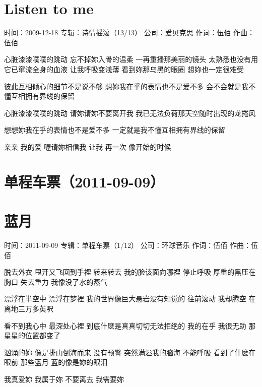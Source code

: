 \documentclass[UTF8,a4paper,oneside,twocolumn,12pt]{ctexbook}
\newcommand{\infopair}[2]{\textbullet #1：#2}
\newcommand{\zc}[1][伍佰]{\infopair{作词}{#1}}
\newcommand{\zq}[1][伍佰]{\infopair{作曲}{#1}}
\newcommand{\zj}[1]{\infopair{专辑}{#1}}
\newcommand{\sj}[1]{\infopair{时间}{#1}}
\newcommand{\gs}[1]{\infopair{公司}{#1}}
\newenvironment{info}{\begin{flushleft}\kaishu
	}
	{\end{flushleft}\normalsize\yahei\par}
\newenvironment{lyric}{
	}
{}
\begin{document}
\section{Listen to me}
\begin{info}
	\sj{2009-12-18}
	\zj{诗情摇滚（13/13）}
	\gs{爱贝克思}
	\zc
	\zq
\end{info}
\begin{lyric}
	心脏漆漆噗噗的跳动 忘不掉妳入骨的温柔
	一再重播那美丽的镜头 太熟悉也没有用
	它已窜流全身的血液 让我呼吸变浅薄
	看到妳那乌黑的眼圈 想妳也一定很难受

	彼此互相倾心的细节不是说不够
	想妳我在乎的表情也不是爱不多
	会不会就是我不懂互相拥有界线的保留

	心脏漆漆噗噗的跳动 请妳请妳不要离开我
	我已无法负荷那天空随时出现的龙捲风

	想想妳我在乎的表情也不是爱不多
	一定就是我不懂互相拥有界线的保留

	亲亲 我的爱 喔请妳相信我
	让我 再一次 像开始的时候
\end{lyric}

\section*{单程车票（2011-09-09）}
\section{蓝月}
\begin{info}
	\sj{2011-09-09}
	\zj{单程车票（1/12）}
	\gs{环球音乐}
	\zc
	\zq
\end{info}
\begin{lyric}
	脱去外衣 甩开又飞回到手裡
	转来转去 我的脸该面向哪裡
	停止呼吸 厚重的黑压在胸口
	失去重力 我像没了水的蒸气

	漂浮在半空中 漂浮在梦裡
	我的世界像巨大悬岩没有知觉的
	往前滚动 我却腾空
	在离地三万多英呎

	看不到我心中 最深处心裡
	到底什麽是真真切切无法拒绝的
	我的在乎 我很无助
	那星星的位置都变了

	汹涌的妳 像是排山倒海而来
	没有预警 突然满溢我的脑海
	不能呼吸 看到了什麽在眼前
	那些蓝月 蓝的像是妳的眼泪

	我真爱妳 我属于妳
	不要离去 我需要妳
\end{lyric}
\end{document}
